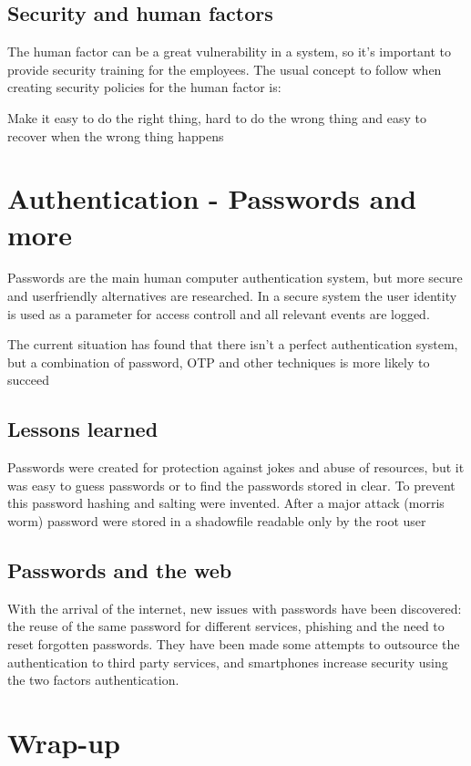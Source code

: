 \documentclass[12pt, a4paper]{article}
\begin{document}
\subsection{Security and human factors}
The human factor can be a great vulnerability in a system, so it's important to provide security training for the employees.
The usual concept to follow when creating security policies for the human factor is:
\begin{center}
    Make it easy to do the right thing, hard to do the wrong thing and easy to recover when the wrong thing happens
\end{center}

\newpage
\section{Authentication - Passwords and more}
Passwords are the main human computer authentication system, but more secure and userfriendly alternatives are researched.
In a secure system  the user identity is used as a parameter for access controll and all relevant events are logged.

The current situation has found that there isn't a perfect authentication system, but a combination of password, OTP and other
techniques is more likely to succeed

\subsection{Lessons learned}
Passwords were created for protection against jokes and abuse of resources, but it was easy to guess passwords or to find the 
passwords stored in clear. To prevent this password hashing and salting were invented. After a major attack (morris worm) password
were stored in a shadowfile readable only by the root user

\subsection{Passwords and the web}
With the arrival of the internet, new issues with passwords have been discovered: the reuse of the same password for different 
services, phishing and the need to reset forgotten passwords. They have been made some attempts to outsource the authentication
to third party services, and smartphones increase security using the two factors authentication.




\newpage
\section{Wrap-up}
\end{document}
